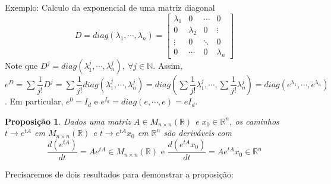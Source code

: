 \documentclass[a4paper, 12pt]{article}
\renewcommand{\Bbb}{\mathbb}
\newtheorem*{9}{Proposição}
\begin{document}
Exemplo: Calculo da exponencial de uma matriz diagonal 
$$D=diag(\lambda_1,\cdots,\lambda_n)=\begin{bmatrix}
\lambda_1 & 0 & \cdots & 0\\
0 & \lambda_2 & 0 & \vdots\\
\vdots & 0 & \ddots & 0\\
0 & \cdots & 0 &\lambda_n
\end{bmatrix}$$
Note que $D^j=diag(\lambda^j_1,\cdots,\lambda^j_n),\ \forall j\in \Bbb N$. Assim, $e^D=\sum\dfrac{1}{j!}D^j=\sum\dfrac{1}{j!}diag(\lambda^j_1,\cdots,\lambda^j_n)=diag(\sum\dfrac{1}{j!}\lambda^j_1,\cdots,\sum\dfrac{1}{j!}\lambda^j_n)=diag(e^{\lambda_1},\cdots,e^{\lambda_n})$. Em particular, $e^0=I_d$ e $e^{I_d}=diag(e,\cdots,e)=eI_d$. 
\begin{9}
Dados uma matriz $A\in M_{n\times n}(\Bbb R)$ e $x_0 \in \Bbb R^n$, os caminhos $t\to e^{tA}$ em $M_{n\times n}(\Bbb R)$ e $t\to e^{tA}x_0$ em $\Bbb R^n$ são deriváveis com
$$\dfrac{d(e^{tA})}{dt} = Ae^{tA} \in M_{n\times n}(\Bbb R) \text{ e } \dfrac{d(e^{tA}x_0)}{dt}=Ae^{tA}x_0 \in \Bbb R^n$$
\end{9}
Precisaremos de dois resultados para demonstrar a proposição:
\end{document}
